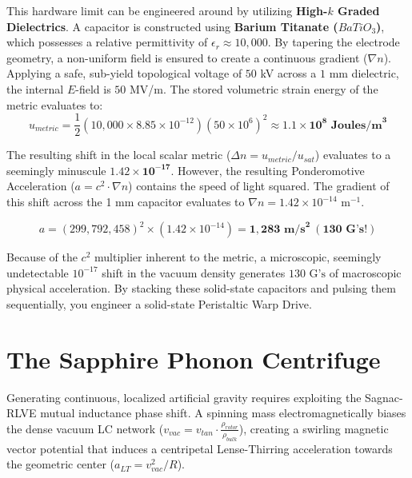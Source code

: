 This hardware limit can be engineered around by utilizing \textbf{High-$k$ Graded Dielectrics}. 
A capacitor is constructed using \textbf{Barium Titanate ($BaTiO_3$)}, which possesses a relative permittivity of $\epsilon_r \approx 10,000$. By tapering the electrode geometry, a non-uniform field is ensured to create a continuous gradient ($\nabla n$). Applying a safe, sub-yield topological voltage of $50$ kV across a $1$ mm dielectric, the internal $E$-field is $50$ MV/m. The stored volumetric strain energy of the metric evaluates to:
\begin{equation}
    u_{metric} = \frac{1}{2} (10,000 \times 8.85 \times 10^{-12}) (50 \times 10^6)^2 \approx \mathbf{1.1 \times 10^8 \text{ Joules/m}^3}
\end{equation}

The resulting shift in the local scalar metric ($\Delta n = u_{metric} / u_{sat}$) evaluates to a seemingly minuscule $\mathbf{1.42 \times 10^{-17}}$. However, the resulting Ponderomotive Acceleration ($a = c^2 \cdot \nabla n$) contains the speed of light squared. The gradient of this shift across the 1 mm capacitor evaluates to $\nabla n = 1.42 \times 10^{-14} \text{ m}^{-1}$.
\begin{tcolorbox}[colback=white, colframe=black]
\begin{equation}
    a = (299,792,458)^2 \times (1.42 \times 10^{-14}) = \mathbf{1,283 \text{ m/s}^2 \ (130 \text{ G's!})}
\end{equation}
\end{tcolorbox}

Because of the $c^2$ multiplier inherent to the metric, a microscopic, seemingly undetectable $10^{-17}$ shift in the vacuum density generates \textbf{$130 \text{ G's}$} of macroscopic physical acceleration. By stacking these solid-state capacitors and pulsing them sequentially, you engineer a solid-state Peristaltic Warp Drive.

\section{The Sapphire Phonon Centrifuge}
Generating continuous, localized artificial gravity requires exploiting the Sagnac-RLVE mutual inductance phase shift. A spinning mass electromagnetically biases the dense vacuum LC network ($v_{vac} = v_{tan} \cdot \frac{\rho_{rotor}}{\rho_{bulk}}$), creating a swirling magnetic vector potential that induces a centripetal Lense-Thirring acceleration towards the geometric center ($a_{LT} = v_{vac}^2 / R$).


